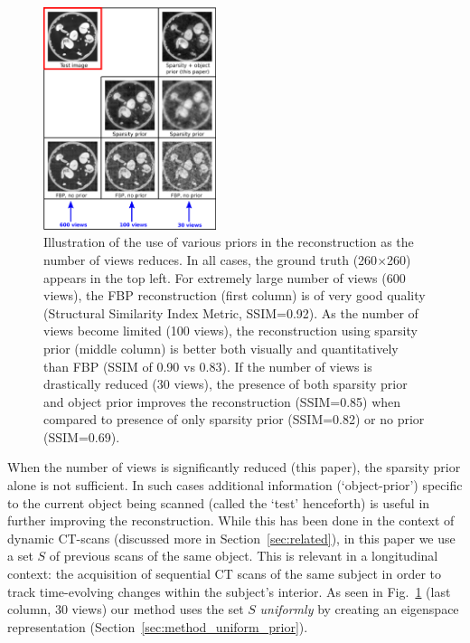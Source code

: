 \documentclass[journal]{IEEEtran}
\begin{document}
 \begin{figure}[t]
\centering
	\includegraphics[width=0.45\textwidth]{../images/story/story.png}
        \caption{Illustration of the use of various priors in the
          reconstruction as the number of views reduces. In all cases,
          the ground truth (260$\times$260) appears in the top left.
          For extremely large number of views (600 views), the FBP
          reconstruction (first column) is of very good quality
          (Structural Similarity Index Metric, SSIM=0.92). As the
          number of views become limited (100 views), the
          reconstruction using sparsity prior (middle column) is
          better both visually and quantitatively than FBP (SSIM of
          0.90 vs 0.83). If the number of views is drastically reduced
          (30 views), the presence of both sparsity prior and object
          prior improves the reconstruction (SSIM=0.85) when compared
          to presence of only sparsity prior (SSIM=0.82) or no prior
          (SSIM=0.69).}
 \label{fig:story}
 \end{figure} 

 When the number of views is significantly reduced (this paper), the
 sparsity prior alone is not sufficient.  In such cases additional
 information (`object-prior') specific to the current
 object being scanned (called the `test' henceforth) is useful in
 further improving the reconstruction.  While this has been done in
 the context of dynamic CT-scans (discussed more in
 Section~\ref{sec:related}), in this paper we use a set $S$ of
 previous scans of the same object. This is relevant in a longitudinal
 context: the acquisition of sequential CT scans of the same subject
 in order to track time-evolving changes within the subject's
 interior. As seen in Fig.~\ref{fig:story} (last column, 30 views) our
 method uses the set $S$ \emph{uniformly} by creating an
 eigenspace representation (Section~\ref{sec:method_uniform_prior}).
\end{document}

